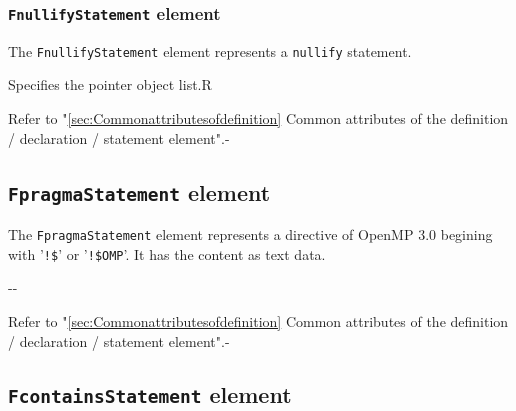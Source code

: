 \subsubsection{ {\tt FnullifyStatement} element}

The {\tt FnullifyStatement} element represents a {\tt nullify} statement.


\begin{XcodeMLChildElements}
{Specifies the pointer object list.}{R}
\end{XcodeMLChildElements}

\begin{XcodeMLAttributes}
{Refer to "\ref{sec:Commonattributesofdefinition} Common attributes of the definition / declaration / statement element".}{-}
\end{XcodeMLAttributes}


\subsection{ {\tt FpragmaStatement} element}

The {\tt FpragmaStatement} element represents a directive of OpenMP 3.0 begining with ’{\tt !\$}’ or ’{\tt !\$OMP}’.
It has the content as text data.


\begin{XcodeMLChildElements}
\XcodeMLElementDef{-}
{-}{-}
\end{XcodeMLChildElements}

\begin{XcodeMLAttributes}
{Refer to "\ref{sec:Commonattributesofdefinition} Common attributes of the definition / declaration / statement element".}{-}
\end{XcodeMLAttributes}


\subsection{ {\tt FcontainsStatement} element}

